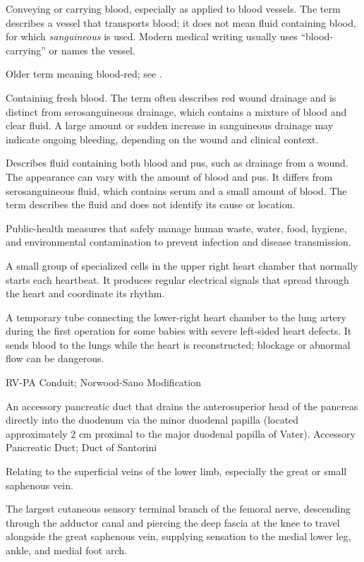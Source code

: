  Conveying or carrying blood, especially as applied to blood vessels. The term describes a vessel that transports blood; it does not mean fluid containing blood, for which \textit{sanguineous} is used. Modern medical writing usually uses “blood-carrying” or names the vessel.

 Older term meaning blood-red; see .

 Containing fresh blood. The term often describes red wound drainage and is distinct from serosanguineous drainage, which contains a mixture of blood and clear fluid. A large amount or sudden increase in sanguineous drainage may indicate ongoing bleeding, depending on the wound and clinical context.

 Describes fluid containing both blood and pus, such as drainage from a wound. The appearance can vary with the amount of blood and pus. It differs from serosanguineous fluid, which contains serum and a small amount of blood. The term describes the fluid and does not identify its cause or location.

 Public-health measures that safely manage human waste, water, food, hygiene, and environmental contamination to prevent infection and disease transmission.

 A small group of specialized cells in the upper right heart chamber that normally starts each heartbeat. It produces regular electrical signals that spread through the heart and coordinate its rhythm.

 A temporary tube connecting the lower-right heart chamber to the lung artery during the first operation for some babies with severe left-sided heart defects. It sends blood to the lungs while the heart is reconstructed; blockage or abnormal flow can be dangerous.

\synonyms
RV-PA Conduit; Norwood-Sano Modification

 An accessory pancreatic duct that drains the anterosuperior head of the pancreas directly into the duodenum via the minor duodenal papilla (located approximately 2 cm proximal to the major duodenal papilla of Vater).
\synonyms
Accessory Pancreatic Duct; Duct of Santorini

 Relating to the superficial veins of the lower limb, especially the great or small saphenous vein.

 The largest cutaneous sensory terminal branch of the femoral nerve, descending through the adductor canal and piercing the deep fascia at the knee to travel alongside the great saphenous vein, supplying sensation to the medial lower leg, ankle, and medial foot arch.


